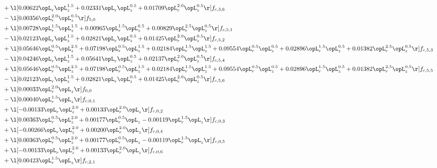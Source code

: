 \begin{alignat}{2}
& + \l[  0.00622 \opL_r \opL_z^{1.5} +  0.02331 \opL_r \opL_z^{0.5} +  0.01709 \opL_r^{2.0} \opL_z^{0.5}  \r] f_{c,3,6} \nonumber \\ 
& - \l[  0.00356 \opL_r^{2.0} \opL_z^{0.5}  \r] f_{5,0} \nonumber \\ 
& + \l[  0.00728 \opL_r^{1.5} \opL_z^{1.5} +  0.00965 \opL_r^{1.5} \opL_z^{0.5} +  0.00829 \opL_r^{2.5} \opL_z^{0.5}  \r] f_{c,5,1} \nonumber \\ 
& - \l[  0.02123 \opL_r \opL_z^{1.5} +  0.02821 \opL_r \opL_z^{0.5} +  0.01425 \opL_r^{2.0} \opL_z^{0.5}  \r] f_{c,5,2} \nonumber \\ 
& + \l[  0.05646 \opL_r^{0.5} \opL_z^{2.5} +  0.07198 \opL_r^{0.5} \opL_z^{1.5} +  0.02184 \opL_r^{1.5} \opL_z^{1.5} +  0.09554 \opL_r^{0.5} \opL_z^{0.5} +  0.02896 \opL_r^{1.5} \opL_z^{0.5} +  0.01382 \opL_r^{2.5} \opL_z^{0.5}  \r] f_{c,5,3} \nonumber \\ 
& - \l[  0.04246 \opL_r \opL_z^{1.5} +  0.05641 \opL_r \opL_z^{0.5} +  0.02137 \opL_r^{2.0} \opL_z^{0.5}  \r] f_{c,5,4} \nonumber \\ 
& + \l[  0.05646 \opL_r^{0.5} \opL_z^{2.5} +  0.07198 \opL_r^{0.5} \opL_z^{1.5} +  0.02184 \opL_r^{1.5} \opL_z^{1.5} +  0.09554 \opL_r^{0.5} \opL_z^{0.5} +  0.02896 \opL_r^{1.5} \opL_z^{0.5} +  0.01382 \opL_r^{2.5} \opL_z^{0.5}  \r] f_{c,5,5} \nonumber \\ 
& - \l[  0.02123 \opL_r \opL_z^{1.5} +  0.02821 \opL_r \opL_z^{0.5} +  0.01425 \opL_r^{2.0} \opL_z^{0.5}  \r] f_{c,5,6} \nonumber \\ 
& + \l[  0.00033 \opL_r^{2.0} \opL_z  \r] f_{0,0} \nonumber \\ 
& - \l[  0.00040 \opL_r^{1.5} \opL_z  \r] f_{c,0,1} \nonumber \\ 
& + \l[  -0.00133 \opL_r \opL_z^{2.0} +  0.00133 \opL_r^{2.0} \opL_z  \r] f_{c,0,2} \nonumber \\ 
& + \l[  0.00363 \opL_r^{0.5} \opL_z^{2.0} +  0.00177 \opL_r^{0.5} \opL_z   -0.00119 \opL_r^{1.5} \opL_z  \r] f_{c,0,3} \nonumber \\ 
& + \l[  -0.00266 \opL_r \opL_z^{2.0} +  0.00200 \opL_r^{2.0} \opL_z  \r] f_{c,0,4} \nonumber \\ 
& + \l[  0.00363 \opL_r^{0.5} \opL_z^{2.0} +  0.00177 \opL_r^{0.5} \opL_z   -0.00119 \opL_r^{1.5} \opL_z  \r] f_{c,0,5} \nonumber \\ 
& + \l[  -0.00133 \opL_r \opL_z^{2.0} +  0.00133 \opL_r^{2.0} \opL_z  \r] f_{c,0,6} \nonumber \\ 
& + \l[  0.00423 \opL_r^{1.5} \opL_z  \r] f_{c,2,1} \nonumber \\ 

\end{alignat}
